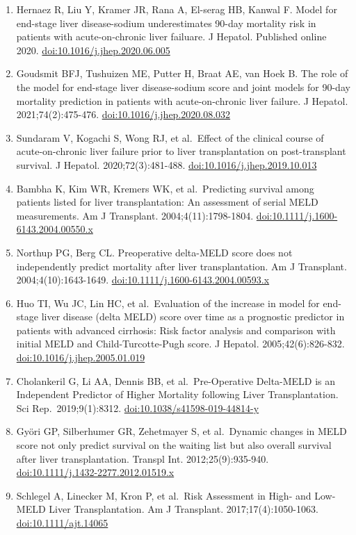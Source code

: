 \documentclass[11pt,english,]{book} %
\begin{document}
\begin{enumerate}
\item
  Hernaez R, Liu Y, Kramer JR, Rana A, El-serag HB, Kanwal F. Model for end-stage liver disease-sodium underestimates 90-day mortality risk in patients with acute-on-chronic liver failuare. J Hepatol. Published online 2020. \url{doi:10.1016/j.jhep.2020.06.005}
\item
  Goudsmit BFJ, Tushuizen ME, Putter H, Braat AE, van Hoek B. The role of the model for end-stage liver disease-sodium score and joint models for 90-day mortality prediction in patients with acute-on-chronic liver failure. J Hepatol. 2021;74(2):475-476. \url{doi:10.1016/j.jhep.2020.08.032}
\item
  Sundaram V, Kogachi S, Wong RJ, et al.~Effect of the clinical course of acute-on-chronic liver failure prior to liver transplantation on post-transplant survival. J Hepatol. 2020;72(3):481-488. \url{doi:10.1016/j.jhep.2019.10.013}
\item
  Bambha K, Kim WR, Kremers WK, et al.~Predicting survival among patients listed for liver transplantation: An assessment of serial MELD measurements. Am J Transplant. 2004;4(11):1798-1804. \url{doi:10.1111/j.1600-6143.2004.00550.x}
\item
  Northup PG, Berg CL. Preoperative delta-MELD score does not independently predict mortality after liver transplantation. Am J Transplant. 2004;4(10):1643-1649. \url{doi:10.1111/j.1600-6143.2004.00593.x}
\item
  Huo TI, Wu JC, Lin HC, et al.~Evaluation of the increase in model for end-stage liver disease (delta MELD) score over time as a prognostic predictor in patients with advanced cirrhosis: Risk factor analysis and comparison with initial MELD and Child-Turcotte-Pugh score. J Hepatol. 2005;42(6):826-832. \url{doi:10.1016/j.jhep.2005.01.019}
\item
  Cholankeril G, Li AA, Dennis BB, et al.~Pre-Operative Delta-MELD is an Independent Predictor of Higher Mortality following Liver Transplantation. Sci Rep.~2019;9(1):8312. \url{doi:10.1038/s41598-019-44814-y}
\item
  Györi GP, Silberhumer GR, Zehetmayer S, et al.~Dynamic changes in MELD score not only predict survival on the waiting list but also overall survival after liver transplantation. Transpl Int. 2012;25(9):935-940. \url{doi:10.1111/j.1432-2277.2012.01519.x}
\item
  Schlegel A, Linecker M, Kron P, et al.~Risk Assessment in High- and Low-MELD Liver Transplantation. Am J Transplant. 2017;17(4):1050-1063. \url{doi:10.1111/ajt.14065}

\end{enumerate}
\end{document}
